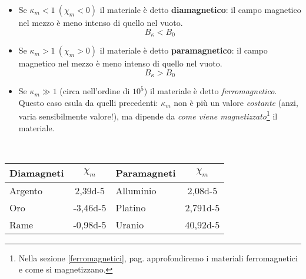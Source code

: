 \begin{itemize}
	\item Se $\kappa_m<1\ (\chi_m<0)$ il materiale è detto \textbf{diamagnetico}: il campo magnetico nel mezzo è meno intenso di quello nel vuoto.
	\begin{equation}
		B_{\kappa}<B_0
	\end{equation}
	\item Se $\kappa_m>1\ (\chi_m>0)$ il materiale è detto \textbf{paramagnetico}: il campo magnetico nel mezzo è meno intenso di quello nel vuoto.
	\begin{equation}
		B_{\kappa}>B_0
	\end{equation}
	\item Se $\kappa_m\gg 1$ (circa nell'ordine di $10^5$) il materiale è detto \textit{ferromagnetico}. Questo caso esula da quelli precedenti: $\kappa_m$ non è più un valore \textit{costante} (anzi, varia sensibilmente valore!), ma dipende da \textit{come viene magnetizzato}\footnote{Nella sezione \ref{ferromagnetici}, pag. \pageref{ferromagnetici} approfondiremo i materiali ferromagnetici e come si magnetizzano.} il materiale.
\end{itemize}
\begin{examplewt}~
	\begin{center}
		\begin{tabular}{l|c|l|c}
			\textbf{Diamagneti} & $\chi_m$ & \textbf{Paramagneti} & $\chi_m$\\
			\hline
			Argento & \num{2,39d-5} 	& Alluminio & \num{2,08d-5}\\
			Oro 	& \num{-3,46d-5} 	& Platino 	& \num{2,791d-5}\\
			Rame 	& \num{-0,98d-5} 	& Uranio 	& \num{40,92d-5}
		\end{tabular}
	\end{center}
\end{examplewt}
